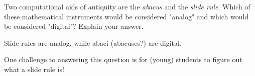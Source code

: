 

Two computational aids of antiquity are the {\it abacus} and the {\it slide rule}.  Which of these mathematical instruments would be considered "analog" and which would be considered "digital"?  Explain your answer.







Slide rules are analog, while abaci (abacuses?) are digital.







One challenge to answering this question is for (young) students to figure out what a slide rule is!




